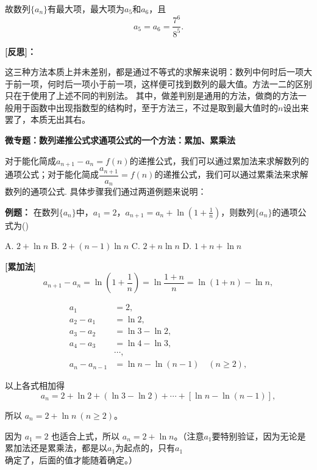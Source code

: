 \documentclass{article}
\begin{document}
故数列$\{a_n\}$有最大项，最大项为$a_5$和$a_6$，且
\[
a_5 = a_6 = \frac{7^6}{8^5}.
\]

\noindent\textbf{[反思]：} 

这三种方法本质上并未差别，都是通过不等式的求解来说明：数列中何时后一项大于前一项，何时后一项小于前一项，这样便可找到数列的最大值。方法一二的区别只在于使用了上述不同的判别法。
其中，做差判别是通用的方法，做商的方法一般用于函数中出现指数型的结构时，至于方法三，不过是取到最大值时的$n$设出来罢了，本质无出其右。
\vspace{2\baselineskip}
\newpage

\begin{center}
    \textbf{微专题：数列递推公式求通项公式的一个方法：累加、累乘法}
\end{center}

对于能化简成$a_{n+1} - a_n = f(n)$的递推公式，我们可以通过累加法来求解数列的通项公式；对于能化简成$\dfrac{a_{n+1}}{a_n} = f(n)$的递推公式，我们可以通过累乘法来求解数列的通项公式.
具体步骤我们通过两道例题来说明：
\vspace{2\baselineskip}

\noindent\textbf{例题： } 在数列$\{a_n\}$中，$a_1 = 2$，$a_{n+1} = a_n + \ln\left(1 + \frac{1}{n}\right)$，则数列$\{a_n\}$的通项公式为(\;\;\;)

\vspace{1em}
A. $2 + \ln n$ \quad
B. $2 + (n-1)\ln n$ \quad
C. $2 + n\ln n$ \quad
D. $1 + n + \ln n$

\bigskip

\noindent\textbf{[累加法]}
\[
a_{n+1} - a_n = \ln\left(1 + \frac{1}{n}\right) = \ln\frac{1+n}{n} = \ln(1+n) - \ln n,
\]

\[
\begin{aligned}
a_1 &= 2, \\
a_2 - a_1 &= \ln 2, \\
a_3 - a_2 &= \ln 3 - \ln 2, \\
a_4 - a_3 &= \ln 4 - \ln 3, \\
&\cdots, \\
a_n - a_{n-1} &= \ln n - \ln(n-1) \quad (n \ge 2),
\end{aligned}
\]

以上各式相加得
\[
a_n = 2 + \ln 2 + (\ln 3 - \ln 2) + \cdots + \left[\ln n - \ln(n-1)\right],
\]

所以 $a_n = 2 + \ln n \ (n \ge 2)$。

因为 $a_1 = 2$ 也适合上式，所以 $a_n = 2 + \ln n$。（注意$a_1$要特别验证，因为无论是累加法还是累乘法，都是以$a_1$为起点的，只有$a_1$确定了，后面的值才能随着确定。）
\end{document}
